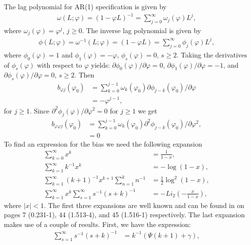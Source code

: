 {{The lag polynomial for AR(1) specification is given by
\begin{align*}
\omega(L;\varphi) = (1-\varphi L )^{-1} = \sum_{j = 0}^{\infty} \omega_j(\varphi) L^j,    
\end{align*}
where $\omega_j(\varphi) = \varphi^j$, $j\geq 0$. The inverse lag polynomial is given by 
\begin{align*}
    \phi(L;\varphi) = \omega^{-1}(L;\varphi) = (1-\varphi L ) = \sum_{j = 0}^{\infty} \phi_j(\varphi) L^j,
\end{align*}
where $\phi_0(\varphi) = 1$ and $\phi_1(\varphi) = -\varphi$, $\phi_s(\varphi) = 0$, $s \geq 2$. Taking the derivatives of $\phi_s(\varphi)$ with respect to $\varphi$ yields: $\partial \phi_0(\varphi)/\partial \varphi = 0$, $\partial \phi_1(\varphi)/\partial \varphi = -1$, and $\partial \phi_s(\varphi)/\partial \varphi = 0$, $s \geq 2$. 
Then
\begin{align*}
    b_{\varphi j}(\varphi_0) &= \sum_{k = 0}^{j-1} \omega_k(\varphi_0) \partial \phi_{j-k}(\varphi_0)/\partial \varphi  \\
    &= -\varphi^{j-1},
\end{align*}
for $j \geq 1$. Since $\partial^2 \phi_j(\varphi)/\partial \varphi^2 = 0$  for $j \geq 1$ we get
\begin{align*}
    b_{\varphi \varphi j}(\varphi_0) &= \sum_{k = 0}^{j-1} \omega_k(\varphi_0) \partial^2 \phi_{j-k}(\varphi_0)/\partial \varphi^2 , \\
    &= 0
\end{align*}
To find an expression for the bias we need the following expansion 
\begin{align}
    \sum_{k = 0}^{\infty} x^{k} &= \frac{1}{1-x},  \label{expans1} \\
    \sum_{k = 1}^{\infty} k^{-1} x^k &= - \log(1-x), \label{expans2}\\
    \sum_{k = 1}^{\infty} (k+1)^{-1} x^{k+1}\sum_{n = 1}^k n^{-1} &= \frac{1}{2} \log^2(1-x) , \label{expans3} \\
    \sum_{k = 1}^{\infty} x^k \sum_{s = 1}^{\infty} s^{-1} (s+k)^{-1} &= -Li_{2} (-\frac{x}{1-x}) , \label{expans4}
\end{align}
where $|x|<1$.
The first three expansions are well known and can be found in \textcite{gradshteyn2014table} on pages 7 (0.231-1), 44 (1.513-4), and 45 (1.516-1) respectively. The last expansion makes use of a couple of results. First, we have the expression:
\begin{align*}
    \sum_{s = 1}^{\infty} s^{-1}(s+k)^{-1} &= k^{-1} \left( \Psi(k+1) + \gamma \right), \\

\end{align*}}}
